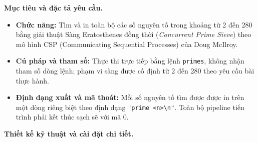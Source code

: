 \documentclass[12pt,a4paper]{article}
\begin{document}
\textbf{Mục tiêu và đặc tả yêu cầu.}
\begin{itemize}
  \item \textbf{Chức năng:} Tìm và in toàn bộ các số nguyên tố trong khoảng từ 2 đến 280 bằng giải thuật Sàng Eratosthenes đồng thời (\textit{Concurrent Prime Sieve}) theo mô hình CSP (Communicating Sequential Processes) của Doug McIlroy.
  \item \textbf{Cú pháp và tham số:} Thực thi trực tiếp bằng lệnh \texttt{primes}, không nhận tham số dòng lệnh; phạm vi sàng được cố định từ 2 đến 280 theo yêu cầu bài thực hành.
  \item \textbf{Định dạng xuất và mã thoát:} Mỗi số nguyên tố tìm được được in trên một dòng riêng biệt theo định dạng \texttt{"prime <n>\textbackslash n"}. Toàn bộ pipeline tiến trình phải kết thúc sạch sẽ với mã $0$.
\end{itemize}

\textbf{Thiết kế kỹ thuật và cài đặt chi tiết.}
\end{document}
